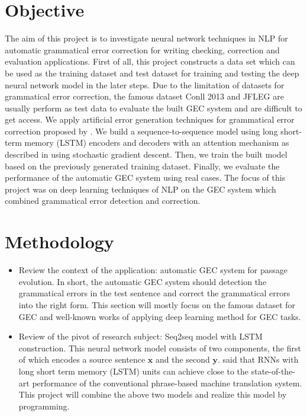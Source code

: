 \section{Objective}
The aim of this project is to investigate neural network techniques in NLP for automatic grammatical error correction for writing checking, correction and evaluation applications. First of all, this project constructs a data set which can be used as the training dataset and test dataset for training and testing the deep neural network model in the later steps. Due to the limitation of datasets for grammatical error correction, the famous dataset Conll 2013 and JFLEG are usually perform as test data to evaluate the built GEC system and are difficult to get access. We apply artificial error generation techniques for grammatical error correction proposed by \cite{felice2014generating}. We build a sequence-to-sequence model using long short-term memory (LSTM) encoders and decoders with an attention mechanism as described in \cite{bahdanau2014neural} using stochastic gradient descent. Then, we train the built model based on the previously generated training dataset. Finally, we evaluate the performance of the automatic GEC system using real cases. The focus of this project was on deep learning techniques of NLP on the GEC system which combined grammatical error detection and correction.

\section{Methodology}
\begin{itemize}
    \item Review the context of the application: automatic GEC system for passage evolution. In short, the automatic GEC system should detection the grammatical errors in the test sentence and correct the grammatical errors into the right form. This section will mostly focus on the famous dataset for GEC and well-known works of applying deep learning method for GEC tasks.
    \item 	Review of the pivot of research subject: Seq2seq model with LSTM construction. This neural network model consists of two components, the first of which encodes a source sentence $\mathbf{x}$ and the second $\mathbf{y}$. \cite{sutskever2014sequence} said that RNNs with long short term memory (LSTM) units can achieve close to the state-of-the-art performance of the conventional phrase-based machine translation system. This project will combine the above two models and realize this model by programming.
\end{itemize}